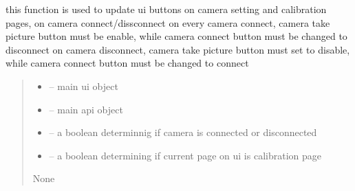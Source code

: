 \documentclass[letterpaper,10pt,english]{sphinxmanual}
\begin{document}
\begin{savenotes}\begin{fulllineitems}
\label{\detokenize{setting/backend/camera_funcs:oxin.backend.camera_funcs.update_ui_on_camera_connect_disconnect}}
\pysigstartsignatures
{}
\pysigstopsignatures
\sphinxAtStartPar
this function is used to update ui buttons on camera setting and calibration pages, on camera connect/dissconnect
on every camera connect, camera take picture button must be enable, while camera connect button must be changed to disconnect
on camera disconnect, camera take picture button must set to disable, while camera connect button must be changed to connect
\begin{quote}\begin{description}
\begin{itemize}
\item {} 
\sphinxAtStartPar
{} – main ui object

\item {} 
\sphinxAtStartPar
{} – main api object

\item {} 
\sphinxAtStartPar
{} – a boolean determinnig if camera is connected or disconnected

\item {} 
\sphinxAtStartPar
{} – a boolean determining if current page on ui is calibration page

\end{itemize}

\sphinxAtStartPar
None

\end{description}\end{quote}

\end{fulllineitems}\end{savenotes}

\end{document}
